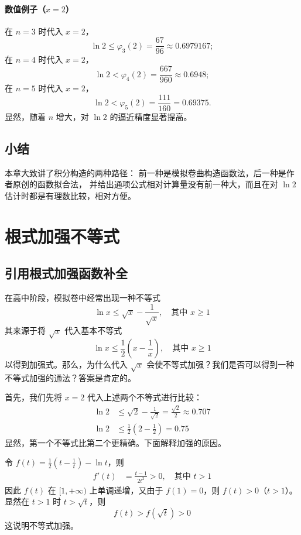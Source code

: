\documentclass[12pt]{article}
\theoremstyle{definition}
\theoremstyle{plain}
\theoremstyle{definition}
\begin{document}
\paragraph{数值例子（$x=2$）}
在 $n=3$ 时代入 $x=2$，
\[
\ln 2 \le \varphi_3(2)=\frac{67}{96}\approx 0.6979167;
\]
在 $n=4$ 时代入 $x=2$，
\[
\ln 2 < \varphi_4(2)=\frac{667}{960}\approx 0.6948;
\]
在 $n=5$ 时代入 $x=2$，
\[
\ln 2 < \varphi_5(2)=\frac{111}{160}=0.69375.
\]
显然，随着 $n$ 增大，对 $\ln 2$ 的逼近精度显著提高。


\subsection{小结}

本章大致讲了积分构造的两种路径：
前一种是模拟卷曲构造函数法，后一种是作者原创的函数拟合法，
并给出通项公式相对计算量没有前一种大，而且在对 \(\ln 2\) 估计时都是有理数比较，相对方便。

\section{根式加强不等式}

\subsection{引用根式加强函数补全}

在高中阶段，模拟卷中经常出现一种不等式
\[\ln x \leq \sqrt{x} - \frac{1}{\sqrt{x}}, \quad \text{其中 } x \geq 1\]
其来源于将 \(\sqrt{x}\) 代入基本不等式
\[\ln x \leq \frac{1}{2}\left( x - \frac{1}{x} \right), \quad \text{其中 } x \geq 1\]
以得到加强式。那么，为什么代入 \(\sqrt{x}\) 会使不等式加强？我们是否可以得到一种不等式加强的通法？答案是肯定的。

首先，我们先将 \(x = 2\) 代入上述两个不等式进行比较：
\begin{align*}
\ln 2 &\leq \sqrt{2} - \frac{1}{\sqrt{2}} = \frac{\sqrt{2}}{2} \approx 0.707 \\
\ln 2 &\leq \frac{1}{2}\left( 2 - \frac{1}{2} \right) = 0.75
\end{align*}
显然，第一个不等式比第二个更精确。下面解释加强的原因。

令 \(f(t) = \frac{1}{2}\left( t - \frac{1}{t} \right) - \ln t\)，则
\begin{align*}
f'(t) &= \frac{t - 1}{2t^{2}} > 0, \quad \text{其中 } t > 1
\end{align*}
因此 \(f(t)\) 在 \([1, +\infty)\) 上单调递增，又由于 \(f(1) = 0\)，则 \(f(t) > 0\)（\(t > 1\)）。显然在 \(t > 1\) 时 \(t > \sqrt{t}\)，则
\[f(t) > f\left( \sqrt{t} \right) > 0\]
这说明不等式加强。
\end{document}
